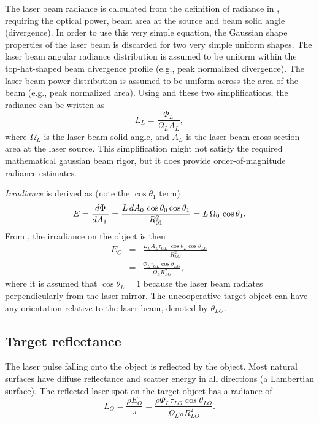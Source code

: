 The laser beam radiance is calculated from the definition of radiance in , requiring the optical power, beam area at the source and beam solid angle (divergence).  In order to use this very simple equation, the Gaussian shape properties of the laser beam is discarded for two very simple uniform shapes.
The laser beam angular radiance distribution is assumed to be uniform within the top-hat-shaped beam divergence profile (e.g., peak normalized divergence). The laser beam power distribution is assumed to be uniform across the area of the beam (e.g., peak normalized area). Using  and these two simplifications, the radiance can be written as
\begin{equation}
L_L=\frac{\Phi_L}{\Omega_L A_L},\label{fig:laserrangeirrad}
\end{equation}
where $\Omega_L$ is the laser beam solid angle, and $A_L$ is the laser beam cross-section area at the laser source. This simplification might not satisfy the required mathematical gaussian beam rigor, but it does provide order-of-magnitude radiance estimates.

\textit{Irradiance} is derived as (note the $\cos\theta_1$ term)
\begin{equation}
E=\frac{d{}\Phi}{d{}A_1\,}=
\frac{L\,d{}A_0\,\cos\theta_0\cos\theta_1}{R_{01}^2}=L\,\Omega_0\,\cos\theta_1.
\label{irradef}
\end{equation}
From , the irradiance on the object is then 
\begin{eqnarray}
E_O&=&\frac{L_L A_L \tau_{OL}\;\cos\theta_L\cos\theta_{LO}}{R^2_{LO}}\nonumber\\
&=&\frac{\Phi_L \tau_{OL}\cos\theta_{LO}}{\Omega_L R^2_{LO}},
\end{eqnarray}
where it is assumed that $\cos\theta_{L}=1$ because the laser beam radiates perpendicularly from the laser mirror. The uncooperative target object can have any orientation relative to the laser beam, denoted by $\theta_{LO}$.


\subsection{Target reflectance}
\noindent
The laser pulse falling onto the object is reflected by the object. Most
natural surfaces have diffuse reflectance and scatter energy in all
directions (a Lambertian surface). The reflected laser spot on the target object has a radiance of
\begin{equation}
L_O=\frac{\rho E_O}{\pi}=\frac{\rho\Phi_L \tau_{LO}\cos\theta_{LO}}{\Omega_L
\pi R^2_{LO}}.\label{loo}
\end{equation}


